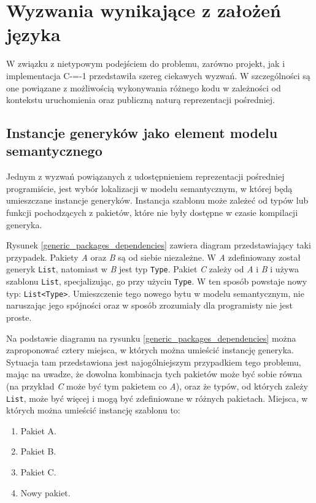 \section{Wyzwania wynikające z założeń języka}

W związku z nietypowym podejściem do problemu, zarówno projekt, jak i implementacja C-=-1 przedstawiła szereg ciekawych wyzwań.
W szczególności są one powiązane z możliwością wykonywania różnego kodu w zależności od kontekstu uruchomienia oraz publiczną naturą reprezentacji pośredniej.

\subsection{Instancje generyków jako element modelu semantycznego}
\label{challenges:generic_instance_placement}
Jednym z wyzwań powiązanych z udostępnieniem reprezentacji pośredniej programiście, jest wybór lokalizacji w modelu semantycznym, w której będą umieszczane instancje generyków.
Instancja szablonu może zależeć od typów lub funkcji pochodzących z pakietów, które nie były dostępne w czasie kompilacji generyka.

Rysunek \ref{generic_packages_dependencies} zawiera diagram przedstawiający taki przypadek.
Pakiety \emph{A} oraz \emph{B} są od siebie niezależne.
W \emph{A} zdefiniowany został generyk \lstinline{List}, natomiast w \emph{B} jest typ \lstinline{Type}.
Pakiet \emph{C} zależy od \emph{A} i \emph{B} i używa szablonu \lstinline{List}, specjalizując, go przy użyciu \lstinline{Type}.
W ten sposób powstaje nowy typ: \lstinline{List<Type>}.
Umieszczenie tego nowego bytu w modelu semantycznym, nie naruszając jego spójności oraz w sposób zrozumiały dla programisty nie jest proste.

Na podstawie diagramu na rysunku \ref{generic_packages_dependencies} można zaproponować cztery miejsca, w których można umieścić instancję generyka.
Sytuacja tam przedstawiona jest najogólniejszym przypadkiem tego problemu, mając na uwadze, że dowolna kombinacja tych pakietów może być sobie równa (na przykład \emph{C} może być tym pakietem co \emph{A}), oraz że typów, od których zależy \lstinline{List}, może być więcej i mogą być zdefiniowane w różnych pakietach.
Miejsca, w których można umieścić instancję szablonu to: \begin{enumerate}
	\item \label{generic_location:A} Pakiet A.
	\item \label{generic_location:B} Pakiet B.
	\item \label{generic_location:C} Pakiet C.
	\item \label{generic_location:new} Nowy pakiet.
\end{enumerate}

